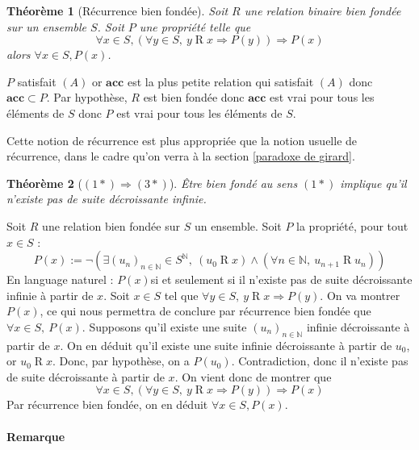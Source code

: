 \documentclass[a4paper,12pt]{article}
\theoremstyle{plain}
\newtheorem{theo}{Théorème}[subsection]
\newenvironment{demo}[1][]
 {\if\relax\detokenize{#1}\relax
    \renewcommand\theproofinner{\thetheo}%
  \else
    \renewcommand{\theproofinner}{#1}%
  \fi
  \proofinner}
 {\endproofinner}
\begin{document}
\begin{theo}[Récurrence bien fondée]
\label{rec bf}
Soit $R$ une relation binaire bien fondée sur un ensemble $S$. Soit $P$ une propriété telle que $$\forall x \in S, (\forall y \in S, \ y \mathbin{R} x \Rightarrow P(y)) \Rightarrow P(x)$$ alors $\forall x \in S, P(x)$.
\end{theo}

\begin{demo} $P$ satisfait $(A)$ or $\mathbf{acc}$
est la plus petite relation qui satisfait $(A)$ donc $\mathbf{acc}\subset P$. Par hypothèse, $R$ est bien fondée donc $\mathbf{acc}$ est vrai pour tous les éléments de $S$ donc $P$ est vrai pour tous les éléments de $S$. 
\end{demo}

Cette notion de récurrence est plus appropriée que la notion usuelle de récurrence, dans le cadre qu'on verra à la section
\ref{paradoxe de girard}.

\begin{theo}[$(1*) \Rightarrow(3*)$]
\label{un trois}
Être bien fondé au sens $(1*)$ implique qu'il n'existe pas de suite décroissante infinie. 
\end{theo}

\begin{demo} Soit $R$ une relation bien fondée sur
$S$ un ensemble. Soit $P$ la propriété, pour tout $x \in S$ :
$$P(x) := \neg( \exists (u_n)_{n \in \mathbb{N}} \in S^\mathbb{N}, \ (u_0 \mathbin{R} x) \land (\forall n \in \mathbb{N}, \ u_{n +1} \mathbin{R} u_n))$$
En language naturel : $P(x)$si et seulement si il n'existe pas de suite décroissante
infinie à partir de $x$. Soit $x \in S$ tel que
$\forall y \in S, \ y \mathbin{R} x \Rightarrow P(y)$. On va montrer
$P(x)$, ce qui nous permettra de conclure par récurrence bien fondée
que $\forall x \in S, \ P(x)$. Supposons qu'il existe une suite
$(u_n)_{n \in \mathbb{N}}$ infinie décroissante à partir de $x$. On
en déduit qu'il existe une suite infinie décroissante à partir de
$u_0$, or $u_0 \mathbin{R} x$. Donc, par hypothèse, on a $P(u_0)$.
Contradiction, donc il n'existe pas de suite décroissante à partir de
$x$. On vient donc de montrer que
$$\forall x \in S, (\forall y \in S, \ y \mathbin{R} x \Rightarrow P(y)) \Rightarrow P(x)$$
Par récurrence bien fondée, on en déduit $\forall x \in S, P(x)$.
\end{demo}

\clearpage

\paragraph{Remarque}
\end{document}
